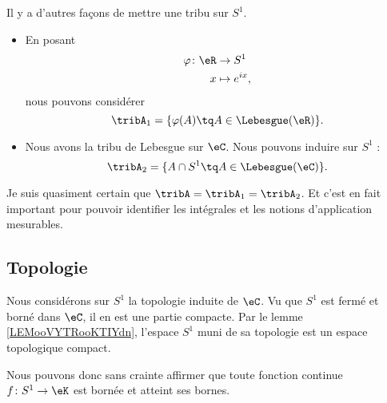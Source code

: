 Il y a d'autres façons de mettre une tribu sur \( S^1\).
\begin{itemize}
    \item En posant
        \begin{equation}
            \begin{aligned}
                \varphi\colon \eR&\to S^1 \\
                x&\mapsto  e^{ix}, 
            \end{aligned}
        \end{equation}
        nous pouvons considérer
        \begin{equation}
            \tribA_1=\{ \varphi(A)\tq A\in\Lebesgue(\eR) \}.
        \end{equation}
    \item
        Nous avons la tribu de Lebesgue sur \( \eC\). Nous pouvons induire sur \( S^1\) :
        \begin{equation}
            \tribA_2=\{ A\cap S^1\tq A\in \Lebesgue(\eC) \}.
        \end{equation}
\end{itemize}

\begin{probleme}
    Je suis quasiment certain que \( \tribA=\tribA_1=\tribA_2\). Et c'est en fait important pour pouvoir identifier les intégrales et les notions d'application mesurables.
\end{probleme}

\subsection{Topologie}

Nous considérons sur \( S^1\) la topologie induite de \( \eC\). Vu que \( S^1\) est fermé et borné dans \( \eC\), il en est une partie compacte. Par le lemme \ref{LEMooVYTRooKTIYdn}, l'espace \( S^1\) muni de sa topologie est un espace topologique compact.

Nous pouvons donc sans crainte affirmer que toute fonction continue \( f\colon S^1\to \eK\) est bornée et atteint ses bornes.

